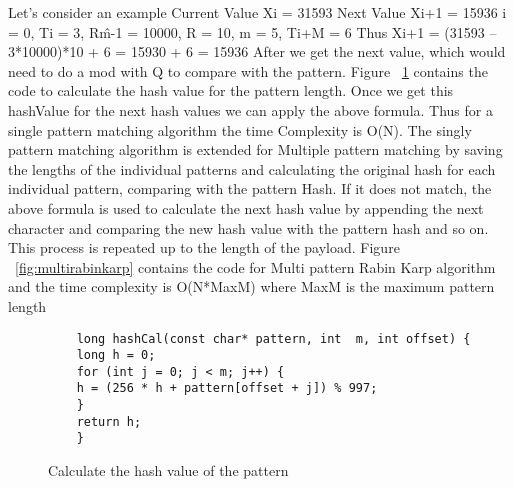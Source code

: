 Let’s consider an example
Current Value Xi = 31593
Next Value Xi+1 = 15936
i = 0, Ti = 3, R\^m-1 = 10000, R = 10, m = 5, Ti+M = 6
Thus Xi+1 = (31593 – 3*10000)*10 + 6 = 15930 + 6 = 15936
After we get the next value, which would need to do a mod with Q to compare with the pattern.
Figure ~\ref{fig:modulohash} contains the code to calculate the hash value for the pattern length. Once we get this hashValue for the next hash values we can apply the above formula.
Thus for a single pattern matching algorithm the time Complexity is O(N). The singly pattern matching algorithm is extended for Multiple pattern matching by saving the lengths of the individual patterns and calculating the original hash for each individual pattern, comparing with the pattern Hash. If it does not match, the above formula is used to calculate the next hash value by appending the next character and comparing the new hash value with the pattern hash and so on. This process is repeated up to the length of the payload.
Figure ~\ref{fig:multirabinkarp} contains the code for Multi pattern Rabin Karp algorithm and the time complexity is O(N*MaxM) where MaxM is the maximum pattern length
\begin{figure}
	\centering
	\begin{lstlisting}
	long hashCal(const char* pattern, int  m, int offset) {
	long h = 0;
	for (int j = 0; j < m; j++) {
	h = (256 * h + pattern[offset + j]) % 997;
	}
	return h;
	}
	\end{lstlisting}
	\caption{Calculate the hash value of the pattern}
	\label{fig:modulohash}
\end{figure}

